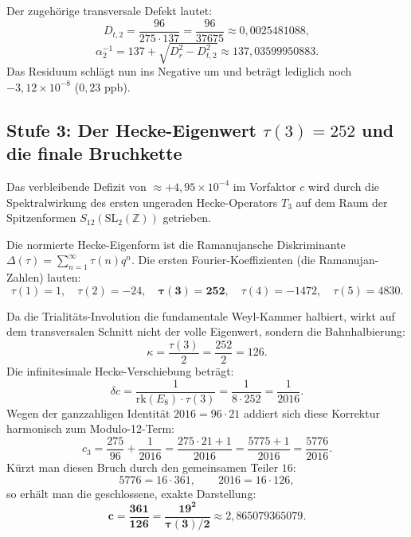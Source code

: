 \documentclass[11pt,a4paper]{article}
\theoremstyle{definition}
\theoremstyle{remark}
\numberwithin{equation}{section}
\begin{document}
Der zugehörige transversale Defekt lautet:
\begin{equation}
D_{t,2} = \frac{96}{275 \cdot 137} = \frac{96}{37675} \approx 0{,}0025481088,
\end{equation}
\begin{equation}
\alpha^{-1}_2 = 137 + \sqrt{D_r^2 - D_{t,2}^2} \approx 137{,}03599950883.
\end{equation}
Das Residuum schlägt nun ins Negative um und beträgt lediglich noch $-3{,}12 \times 10^{-8}$ ($0{,}23\text{ ppb}$).

\subsection{Stufe 3: Der Hecke-Eigenwert $\tau(3) = 252$ und die finale Bruchkette}

Das verbleibende Defizit von $\approx +4{,}95 \times 10^{-4}$ im Vorfaktor $c$ wird durch die Spektralwirkung des ersten ungeraden Hecke-Operators $T_3$ auf dem Raum der Spitzenformen $S_{12}(\mathrm{SL}_2(\mathbb{Z}))$ getrieben. 

Die normierte Hecke-Eigenform ist die Ramanujansche Diskriminante $\Delta(\tau) = \sum_{n=1}^\infty \tau(n) q^n$. Die ersten Fourier-Koeffizienten (die Ramanujan-Zahlen) lauten:
\begin{equation}
\tau(1) = 1, \quad \tau(2) = -24, \quad \mathbf{\tau(3) = 252}, \quad \tau(4) = -1472, \quad \tau(5) = 4830.
\end{equation}

Da die Trialitäts-Involution die fundamentale Weyl-Kammer halbiert, wirkt auf dem transversalen Schnitt nicht der volle Eigenwert, sondern die Bahnhalbierung:
\begin{equation}
\kappa = \frac{\tau(3)}{2} = \frac{252}{2} = 126.
\end{equation}
Die infinitesimale Hecke-Verschiebung beträgt:
\begin{equation}
\delta c = \frac{1}{\mathrm{rk}(E_8) \cdot \tau(3)} = \frac{1}{8 \cdot 252} = \frac{1}{2016}.
\end{equation}
Wegen der ganzzahligen Identität $2016 = 96 \cdot 21$ addiert sich diese Korrektur harmonisch zum Modulo-12-Term:
\begin{equation}
c_3 = \frac{275}{96} + \frac{1}{2016} = \frac{275 \cdot 21 + 1}{2016} = \frac{5775 + 1}{2016} = \frac{5776}{2016}.
\end{equation}
Kürzt man diesen Bruch durch den gemeinsamen Teiler $16$:
\begin{equation}
5776 = 16 \cdot 361, \qquad 2016 = 16 \cdot 126,
\end{equation}
so erhält man die geschlossene, exakte Darstellung:
\begin{equation}
\mathbf{c = \frac{361}{126} = \frac{19^2}{\tau(3)/2}} \approx 2{,}865079365079.
\end{equation}
\end{document}
